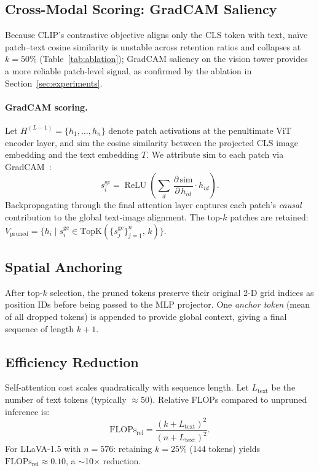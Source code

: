 \documentclass[10pt,twocolumn,letterpaper]{article}
\begin{document}
\subsection{Cross-Modal Scoring: GradCAM Saliency}

Because CLIP's contrastive objective aligns only the CLS token with text,
naïve patch--text cosine similarity is unstable across retention ratios
and collapses at $k{=}50\%$ (Table~\ref{tab:ablation}); GradCAM saliency
on the vision tower provides a more reliable patch-level signal,
as confirmed by the ablation in Section~\ref{sec:experiments}.

\paragraph{GradCAM scoring.}
Let $H^{(L-1)} = \{h_1,\ldots,h_n\}$ denote patch activations at the
penultimate ViT encoder layer, and $\text{sim}$ the cosine similarity
between the projected CLS image embedding and the text embedding $T$.
We attribute $\text{sim}$ to each patch via GradCAM~\cite{selvaraju2017gradcam}:
\begin{equation}
  s^{\text{gc}}_i = \operatorname{ReLU}\!\left(
        \sum_{d}\, \frac{\partial\,\text{sim}}{\partial\, h_{id}}\cdot h_{id}
        \right).
  \label{eq:gradcam}
\end{equation}
Backpropagating through the final attention layer captures each patch's
\emph{causal} contribution to the global text-image alignment.
The top-$k$ patches are retained:
$V_{\text{pruned}} = \{h_i \mid s^{\text{gc}}_i \in \text{TopK}(\{s^{\text{gc}}_j\}_{j=1}^{n},\, k)\}$.

\subsection{Spatial Anchoring}

After top-$k$ selection, the pruned tokens preserve their original 2-D
grid indices as position IDs before being passed to the MLP projector.
One \emph{anchor token} (mean of all dropped tokens) is appended to
provide global context, giving a final sequence of length $k+1$.

\subsection{Efficiency Reduction}

Self-attention cost scales quadratically with sequence length.
Let $L_{\text{text}}$ be the number of text tokens (typically $\approx$50).
Relative FLOPs compared to unpruned inference is:
\begin{equation}
  \text{FLOPs}_{\text{rel}} =
  \frac{(k + L_{\text{text}})^2}{(n + L_{\text{text}})^2}.
  \label{eq:flops}
\end{equation}
For LLaVA-1.5 with $n=576$: retaining $k=25\%$ ($144$ tokens) yields
$\text{FLOPs}_{\text{rel}} \approx 0.10$, a $\sim$10$\times$ reduction.
\end{document}

